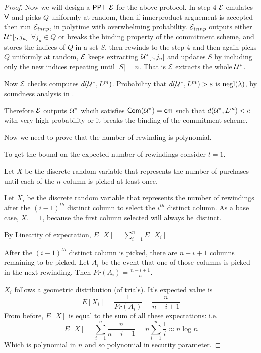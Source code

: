 \begin{proof}
	Now we will design a $\mathsf{PPT}$ $\mathcal{E}$ for the above protocol.
	In step 4 $\mathcal{E}$ emulates $\mathsf{V}$ and picks $Q$ uniformly at random, then if innerproduct arguement is accepted then run $\mathcal{E}_{innp}$, in polytime with overwhelming probability. $\mathcal{E}_{innp}$ outputs either $\mathcal{U}^*[\cdot,j_u]$ $\forall j_u\in Q$ or breaks the binding property of the commitment scheme, and stores the indices of $Q$ in a set $S$. then rewinds to the step 4 and then again picks $Q$ uniformly at random, $\mathcal{E}$ keeps extracting $\mathcal{U}^*[\cdot,j_u]$ and updates $S$ by including only the new indices repeating until $|S|=n$. That is $\mathcal{E}$ extracts the whole $\mathcal{U}^*$.
	\begin{comment}
	In the next step $\extrac$ gets $\calU^*[\cdot,j_u]$ $\forall j_u \in S$. Since $|S|>k$, from $\oracle_x[\cdot,j_u]$ decoding is deterministic, so the $\extrac$ decodes $\oracle$ to $x$ and outputs $x$.
	\end{comment}
	
	Now $\mathcal{E}$ checks computes $d(\mathcal{U}^*, L^m)$. Probability that $d(\mathcal{U}^*,L^m) > e$ is $\mathrm{negl}(\lambda)$, by soundness analysis in \cite{Ligero2017}.
	
	Therefore $\mathcal{E}$ outputs $\mathcal{U}^*$ whcih satisfies $\mathsf{Com}(\mathcal{U}^*) = \mathsf{cm}$ such that $d(\mathcal{U}^*, L^m) < e$ with very high probability or it breaks the binding of the commitment scheme.
	
	Now we need to prove that the number of rewinding is polynomial.
	
	To get the bound on the expected number of rewindings consider $t=1$. 
	
	Let $X$ be the discrete random variable that represents the number of purchases until each of the $n$ column is picked at least once.
	
	Let $X_i$ be the discrete random variable that represents the number of rewindings after the $(i-1)^{th}$ distinct column to select the $i^{th}$ distinct column. As a base case, $X_1=1$, because the first column selected will always be distinct.
	
	By Linearity of expectation, $E[X]=\sum_{i=1}^{n}E[X_i]$
	
	After the $(i-1)^{th}$ distinct column is picked, there are $n-i+1$ columns remaining to be picked. Let $A_i$ be the event that one of those columns is picked in the next rewinding. Then $Pr(A_i)=\frac{n-i+1}{n}$.
	
	$X_i$ follows a geometric distribution (of trials). It's expected value is
	$$E[X_i]= \frac{1}{Pr(A_i)} = \frac{n}{n-i+1}$$
	From before, $E[X]$ is equal to the sum of all these expectations: i.e.
	$$E[X] = \sum\limits_{i=1}^{n} \frac{n}{n-i+1} = n\sum\limits_{i=1}^{n} \frac{1}{i} \approx n \log n$$
	Which is polynomial in $n$ and so polynomial in security parameter.
\end{proof}


